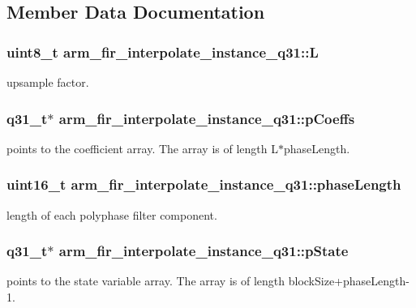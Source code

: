 \subsection{Member Data Documentation}
\hypertarget{structarm__fir__interpolate__instance__q31_a5cdf0a631cb74e0e9588c388abe5235c}{
\subsubsection[{L}]{\setlength{\rightskip}{0pt plus 5cm}uint8\-\_\-t arm\-\_\-fir\-\_\-interpolate\-\_\-instance\-\_\-q31\-::\-L}}\label{structarm__fir__interpolate__instance__q31_a5cdf0a631cb74e0e9588c388abe5235c}
upsample factor. \hypertarget{structarm__fir__interpolate__instance__q31_afa719433687e1936ec3403d0d32f06e6}{
\subsubsection[{p\-Coeffs}]{\setlength{\rightskip}{0pt plus 5cm}q31\-\_\-t$\ast$ arm\-\_\-fir\-\_\-interpolate\-\_\-instance\-\_\-q31\-::p\-Coeffs}}\label{structarm__fir__interpolate__instance__q31_afa719433687e1936ec3403d0d32f06e6}
points to the coefficient array. The array is of length L$\ast$phase\-Length. \hypertarget{structarm__fir__interpolate__instance__q31_a5d243796584afc7cd6c557f00b7acca5}{
\subsubsection[{phase\-Length}]{\setlength{\rightskip}{0pt plus 5cm}uint16\-\_\-t arm\-\_\-fir\-\_\-interpolate\-\_\-instance\-\_\-q31\-::phase\-Length}}\label{structarm__fir__interpolate__instance__q31_a5d243796584afc7cd6c557f00b7acca5}
length of each polyphase filter component. \hypertarget{structarm__fir__interpolate__instance__q31_addde04514b6e6ac72be3d609f0398b1a}{
\subsubsection[{p\-State}]{\setlength{\rightskip}{0pt plus 5cm}q31\-\_\-t$\ast$ arm\-\_\-fir\-\_\-interpolate\-\_\-instance\-\_\-q31\-::p\-State}}\label{structarm__fir__interpolate__instance__q31_addde04514b6e6ac72be3d609f0398b1a}
points to the state variable array. The array is of length block\-Size+phase\-Length-\/1. 

